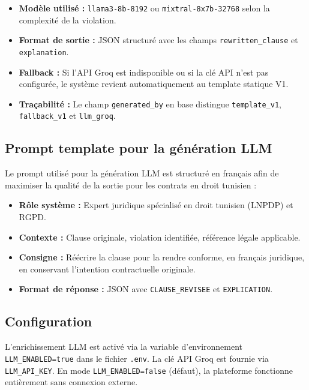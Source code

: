 \begin{itemize}
    \item \textbf{Modèle utilisé :} \texttt{llama3-8b-8192} ou \texttt{mixtral-8x7b-32768} selon la complexité de la violation.
    \item \textbf{Format de sortie :} JSON structuré avec les champs \texttt{rewritten\_clause} et \texttt{explanation}.
    \item \textbf{Fallback :} Si l'API Groq est indisponible ou si la clé API n'est pas configurée, le système revient automatiquement au template statique V1.
    \item \textbf{Traçabilité :} Le champ \texttt{generated\_by} en base distingue \texttt{template\_v1}, \texttt{fallback\_v1} et \texttt{llm\_groq}.
\end{itemize}

\subsection{Prompt template pour la génération LLM}

Le prompt utilisé pour la génération LLM est structuré en français afin de maximiser la qualité de la sortie pour les contrats en droit tunisien :

\begin{itemize}
    \item \textbf{Rôle système :} Expert juridique spécialisé en droit tunisien (LNPDP) et RGPD.
    \item \textbf{Contexte :} Clause originale, violation identifiée, référence légale applicable.
    \item \textbf{Consigne :} Réécrire la clause pour la rendre conforme, en français juridique, en conservant l'intention contractuelle originale.
    \item \textbf{Format de réponse :} JSON avec \texttt{CLAUSE\_REVISEE} et \texttt{EXPLICATION}.
\end{itemize}

\subsection{Configuration}

L'enrichissement LLM est activé via la variable d'environnement \texttt{LLM\_ENABLED=true} dans le fichier \texttt{.env}. La clé API Groq est fournie via \texttt{LLM\_API\_KEY}. En mode \texttt{LLM\_ENABLED=false} (défaut), la plateforme fonctionne entièrement sans connexion externe.


